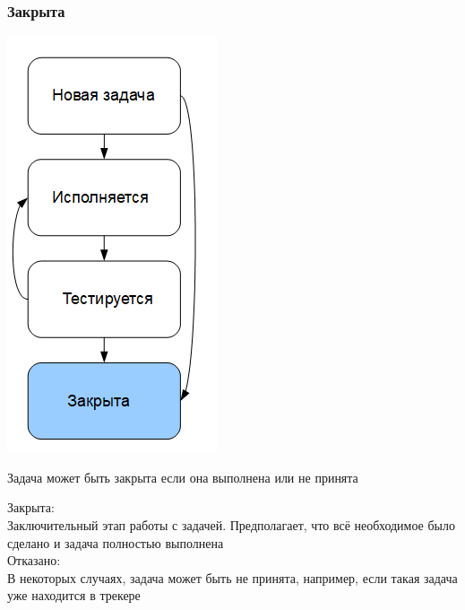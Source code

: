 \documentclass{../industrial-development}
\begin{document}
\begin{frame} \frametitle{Закрыта}
\begin{minipage}{0.4\textwidth}
  \begin{flushleft}
		\includegraphics[height=0.8\textheight]{cyc5.png}
  \end{flushleft}
\end{minipage}
\begin{minipage}{0.59\textwidth}
  \begin{flushright}
		\begin{block}{}
		Задача может быть закрыта если она выполнена или не принята
		\end{block}
  \end{flushright}
\end{minipage}
\end{frame}
\lecturenotes
Закрыта:\\
Заключительный этап работы с задачей. Предполагает, что всё необходимое было сделано и задача полностью выполнена\\
Отказано:\\
В некоторых случаях, задача может быть не принята, например, если такая задача уже находится в трекере
\end{document}
